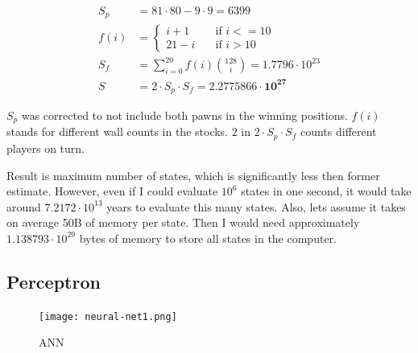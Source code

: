 \documentclass[12pt, oneside]{book}
\begin{document}
    \begin{figure}
      \vspace*{-1.45cm}
      \begin{equation}
        \label{eqn:correctsp}
        \begin{aligned}
          S_p &= 81 {\cdot} 80 - 9 {\cdot} 9 = 6399
          \\
          f(i)&= \begin{cases}
            i + 1  & \quad \text{if } i <= 10 \\
            21 - i & \quad \text{if } i > 10
          \end{cases} \\
          S_f &= \sum_{i=0}^{20} f(i){128 \choose i} = 1.7796 {\cdot} 10^{23}
          \\
          S &= 2 {\cdot} S_p {\cdot} S_f = \mathbf{2.2775866 {\cdot} 10^{27}}
        \end{aligned}
      \end{equation}
      \vspace*{-0.45cm}
    \end{figure}
    $S_p$ was corrected to not include both pawns in the winning positions.
    $f(i)$ %
    stands for different wall counts in the stocks.
    $2$ in $2{\cdot} S_p {\cdot} S_f$ counts different players on turn.

    Result is maximum number of states, which is significantly less then former
    estimate. However, even if I could evaluate $10^{6}$ states in one second,
    it would take around $7.2172{\cdot}10^{13}$ years to evaluate this many
    states. Also, lets assume it takes on average 50B of memory per state. Then
    I would need approximately $1.138793{\cdot}10^{29}$ bytes of memory to
    store all states in the computer.

  \subsection{Perceptron}

    \begin{figure}
      \vspace*{-0.45cm}
      \centering
      \texttt{[image: neural-net1.png]}
      \vspace*{-1.45cm}
      \caption{ANN}
      \label{fig:network}
      \vspace*{-1.00cm}
    \end{figure}
\end{document}
